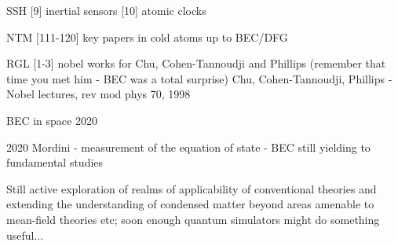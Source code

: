 	SSH [9] inertial sensors [10] atomic clocks 

		NTM [111-120] key papers in cold atoms up to BEC/DFG 

	RGL [1-3] nobel works for Chu, Cohen-Tannoudji and Phillips (remember that time you met him - BEC was a total surprise) 
	Chu, Cohen-Tannoudji, Phillips - Nobel lectures, rev mod phys 70, 1998

	

	BEC in space 2020

	2020 Mordini - measurement of the equation of state - BEC still yielding to fundamental studies

	Still active exploration of realms of applicability of conventional theories and extending the understanding of condensed matter beyond areas amenable to mean-field theories etc; soon enough quantum simulators might do something useful... 

